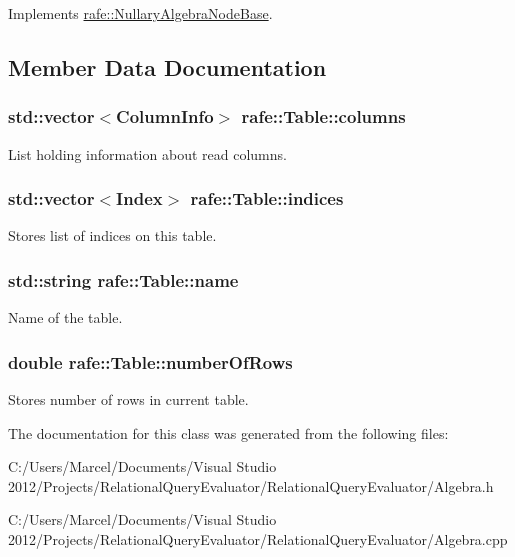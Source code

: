 Implements \hyperlink{classrafe_1_1_nullary_algebra_node_base_a4e1bc16e76d9e41a8fb575008d8f15e5}{rafe\+::\+Nullary\+Algebra\+Node\+Base}.



\subsection{Member Data Documentation}
\hypertarget{classrafe_1_1_table_af3a4fb3f52ae24f09a1073c27bd79a6a}{
\subsubsection[{columns}]{\setlength{\rightskip}{0pt plus 5cm}std\+::vector$<${\bf Column\+Info}$>$ rafe\+::\+Table\+::columns}}\label{classrafe_1_1_table_af3a4fb3f52ae24f09a1073c27bd79a6a}
List holding information about read columns. \hypertarget{classrafe_1_1_table_aaad0b0fba6c76335a428b7e38df992b4}{
\subsubsection[{indices}]{\setlength{\rightskip}{0pt plus 5cm}std\+::vector$<${\bf Index}$>$ rafe\+::\+Table\+::indices}}\label{classrafe_1_1_table_aaad0b0fba6c76335a428b7e38df992b4}
Stores list of indices on this table. \hypertarget{classrafe_1_1_table_a398b089bc1b42a3ca61c21ebda706cc4}{
\subsubsection[{name}]{\setlength{\rightskip}{0pt plus 5cm}std\+::string rafe\+::\+Table\+::name}}\label{classrafe_1_1_table_a398b089bc1b42a3ca61c21ebda706cc4}
Name of the table. \hypertarget{classrafe_1_1_table_aa9c9eecf04e1203cc1f6ac25ecbd2baa}{
\subsubsection[{number\+Of\+Rows}]{\setlength{\rightskip}{0pt plus 5cm}double rafe\+::\+Table\+::number\+Of\+Rows}}\label{classrafe_1_1_table_aa9c9eecf04e1203cc1f6ac25ecbd2baa}
Stores number of rows in current table. 

The documentation for this class was generated from the following files\+:\begin{DoxyCompactItemize}
\item 
C\+:/\+Users/\+Marcel/\+Documents/\+Visual Studio 2012/\+Projects/\+Relational\+Query\+Evaluator/\+Relational\+Query\+Evaluator/Algebra.\+h\item 
C\+:/\+Users/\+Marcel/\+Documents/\+Visual Studio 2012/\+Projects/\+Relational\+Query\+Evaluator/\+Relational\+Query\+Evaluator/Algebra.\+cpp\end{DoxyCompactItemize}
